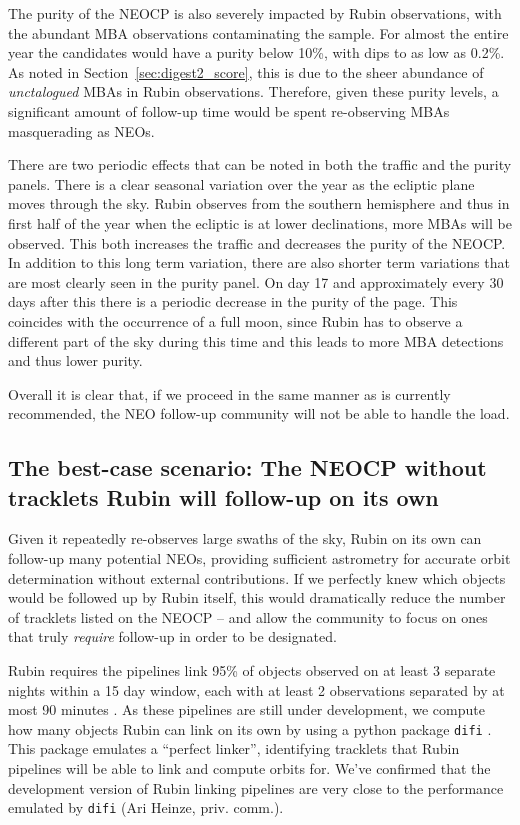 \documentclass[twocolumn]{aastex631}
\begin{document}
The purity of the NEOCP is also severely impacted by Rubin observations, with the abundant MBA observations contaminating the sample. For almost the entire year the candidates would have a purity below 10\%, with dips to as low as 0.2\%. As noted in Section~\ref{sec:digest2_score}, this is due to the sheer abundance of \emph{unctalogued} MBAs in Rubin observations. Therefore, given these purity levels, a significant amount of follow-up time would be spent re-observing MBAs masquerading as NEOs.

There are two periodic effects that can be noted in both the traffic and the purity panels. There is a clear seasonal variation over the year as the ecliptic plane moves through the sky. Rubin observes from the southern hemisphere and thus in first half of the year when the ecliptic is at lower declinations, more MBAs will be observed. This both increases the traffic and decreases the purity of the NEOCP. In addition to this long term variation, there are also shorter term variations that are most clearly seen in the purity panel. On day 17 and approximately every 30 days after this there is a periodic decrease in the purity of the page. This coincides with the occurrence of a full moon, since Rubin has to observe a different part of the sky during this time and this leads to more MBA detections and thus lower purity.

Overall it is clear that, if we proceed in the same manner as is currently recommended, the NEO follow-up community will not be able to handle the load.

\subsection{The best-case scenario: The NEOCP without tracklets Rubin will follow-up on its own}\label{sec:no_LSST_detections}

Given it repeatedly re-observes large swaths of the sky, Rubin on its own can follow-up many potential NEOs, providing sufficient astrometry for accurate orbit determination without external contributions. If we perfectly knew which objects would be followed up by Rubin itself, this would dramatically reduce the number of tracklets listed on the NEOCP -- and allow the community to focus on ones that truly \emph{require} follow-up in order to be designated.

Rubin requires the pipelines link 95\% of objects observed on at least 3 separate nights within a 15 day window, each with at least 2 observations separated by at most 90 minutes \citep{oss}. As these pipelines are still under development, we compute how many objects Rubin can link on its own by using a python package \texttt{difi} \citep{difi}. This package emulates a ``perfect linker'', identifying tracklets that Rubin pipelines will be able to link and compute orbits for. We've confirmed that the development version of Rubin linking pipelines are very close to the performance emulated by \texttt{difi} (Ari Heinze, priv. comm.).
\end{document}
